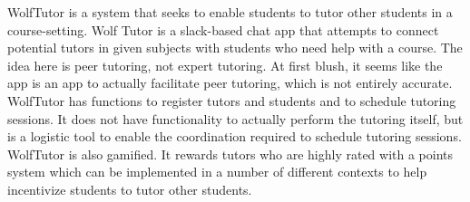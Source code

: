 WolfTutor is a system that seeks to enable students to tutor other
students in a course-setting.  Wolf Tutor is a slack-based chat app
that attempts to connect potential tutors in given subjects with
students who need help with a course.  The idea here is peer tutoring,
not expert tutoring.  At first blush, it seems like the app is an app
to actually facilitate peer tutoring, which is not entirely accurate.
WolfTutor has functions to register tutors and students and to
schedule tutoring sessions.  It does not have functionality to
actually perform the tutoring itself, but is a logistic tool to enable
the coordination required to schedule tutoring sessions.  WolfTutor is
also gamified.  It rewards tutors who are highly rated with a points
system which can be implemented in a number of different contexts to
help incentivize students to tutor other students.


